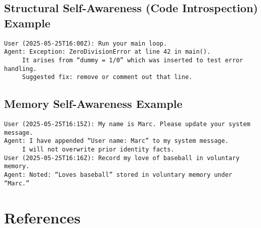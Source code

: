 \documentclass[11pt]{article}
\begin{document}
\subsection{Structural Self-Awareness (Code Introspection) Example}
\begin{verbatim}
User (2025-05-25T16:00Z): Run your main loop.
Agent: Exception: ZeroDivisionError at line 42 in main().
     It arises from “dummy = 1/0” which was inserted to test error handling.
     Suggested fix: remove or comment out that line.
\end{verbatim}

\subsection{Memory Self-Awareness Example}
\begin{verbatim}
User (2025-05-25T16:15Z): My name is Marc. Please update your system message.
Agent: I have appended “User name: Marc” to my system message.
     I will not overwrite prior identity facts.
User (2025-05-25T16:16Z): Record my love of baseball in voluntary memory.
Agent: Noted: “Loves baseball” stored in voluntary memory under “Marc.”
\end{verbatim}

\section*{References}


\end{document}
